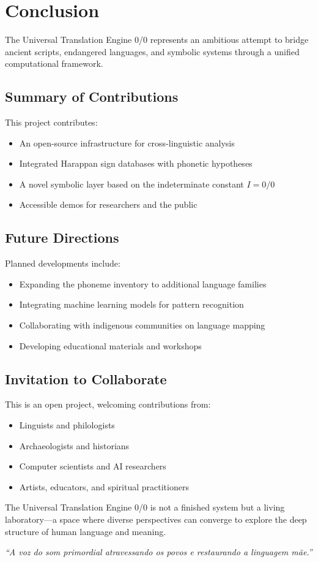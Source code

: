 \section{Conclusion}
\label{sec:conclusion}

The Universal Translation Engine 0/0 represents an ambitious attempt
to bridge ancient scripts, endangered languages, and symbolic systems
through a unified computational framework.

\subsection{Summary of Contributions}
This project contributes:
\begin{itemize}
  \item An open-source infrastructure for cross-linguistic analysis
  \item Integrated Harappan sign databases with phonetic hypotheses
  \item A novel symbolic layer based on the indeterminate constant $I = 0/0$
  \item Accessible demos for researchers and the public
\end{itemize}

\subsection{Future Directions}
Planned developments include:
\begin{itemize}
  \item Expanding the phoneme inventory to additional language families
  \item Integrating machine learning models for pattern recognition
  \item Collaborating with indigenous communities on language mapping
  \item Developing educational materials and workshops
\end{itemize}

\subsection{Invitation to Collaborate}
This is an open project, welcoming contributions from:
\begin{itemize}
  \item Linguists and philologists
  \item Archaeologists and historians
  \item Computer scientists and AI researchers
  \item Artists, educators, and spiritual practitioners
\end{itemize}

The Universal Translation Engine 0/0 is not a finished system but a
living laboratory—a space where diverse perspectives can converge
to explore the deep structure of human language and meaning.

\vspace{1em}
\noindent\textit{``A voz do som primordial atravessando os povos
e restaurando a linguagem mãe.''}
